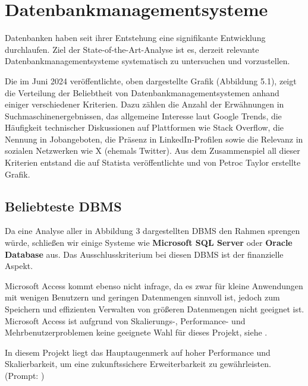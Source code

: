 \section{Datenbankmanagementsysteme}
Datenbanken haben seit ihrer Entstehung eine signifikante Entwicklung durchlaufen. Ziel der State-of-the-Art-Analyse ist es, derzeit relevante Datenbankmanagementsysteme systematisch zu untersuchen und vorzustellen.

\vspace{5mm}

\noindent Die im Juni 2024 veröffentlichte, oben dargestellte Grafik (Abbildung 5.1), zeigt die Verteilung der Beliebtheit von Datenbankmanagementsystemen anhand einiger verschiedener Kriterien. \newline Dazu zählen die Anzahl der Erwähnungen in Suchmaschinenergebnissen, das allgemeine Interesse laut Google Trends, die Häufigkeit technischer Diskussionen auf Plattformen wie Stack Overflow, die Nennung in Jobangeboten, die Präsenz in LinkedIn-Profilen sowie die Relevanz in sozialen Netzwerken wie X (ehemals Twitter). Aus dem Zusammenspiel all dieser Kriterien entstand die auf Statista veröffentlichte und von Petroc Taylor erstellte Grafik.

\newpage
\subsection{Beliebteste DBMS}
Da eine Analyse aller in Abbildung 3 dargestellten DBMS den Rahmen  sprengen würde, schließen wir einige Systeme wie \textbf{Microsoft SQL Server} oder \textbf{Oracle Database} aus. Das Ausschlusskriterium bei diesen DBMS ist der finanzielle Aspekt.

\vspace{2mm} \noindent Microsoft Access kommt ebenso nicht infrage, da es zwar für kleine Anwendungen mit wenigen Benutzern und geringen Datenmengen sinnvoll ist, jedoch zum Speichern und effizienten Verwalten von größeren Datenmengen nicht geeignet ist. Microsoft Access ist aufgrund von Skalierungs-, Performance- und Mehrbenutzerproblemen keine geeignete Wahl für dieses Projekt, siehe \cite{MSAccess:Comparison}.

\vspace{2mm}
\noindent In diesem Projekt liegt das Hauptaugenmerk auf hoher Performance und Skalierbarkeit, um eine zukunftssichere Erweiterbarkeit zu gewährleisten. (Prompt: \cite{ChatGPT:rewrite1})

